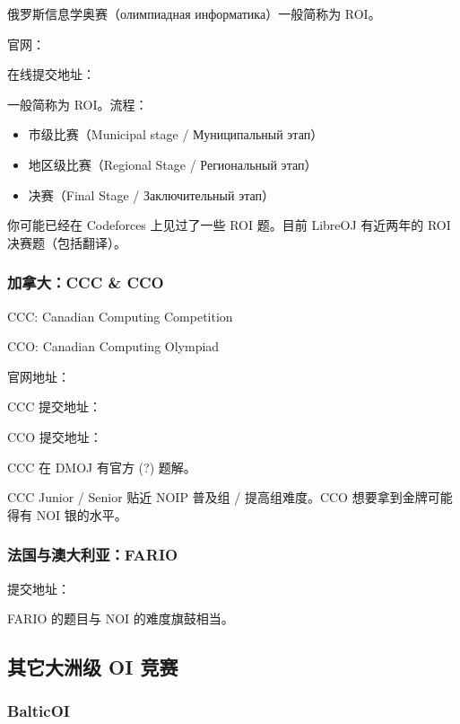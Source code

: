 俄罗斯信息学奥赛（олимпиадная информатика）一般简称为 ROI。  

官网：\href{http://neerc.ifmo.ru/school/archive/index.html}{}  

在线提交地址：\href{https://contest.yandex.ru/roiarchive/}{}  

一般简称为 ROI。流程：

\begin{itemize}
\item 市级比赛（Municipal stage / Муниципальный этап）
\item 地区级比赛（Regional Stage / Региональный этап）
\item 决赛（Final Stage / Заключительный этап）
\end{itemize}

你可能已经在 Codeforces 上见过了一些 ROI 题。目前 LibreOJ 有近两年的 ROI 决赛题（包括翻译）。

\subsubsection{加拿大：CCC \& CCO}

CCC: Canadian Computing Competition  

CCO: Canadian Computing Olympiad  

官网地址：\href{https://cemc.math.uwaterloo.ca/contests/past_contests.html#ccc}{}  

CCC 提交地址：\href{https://dmoj.ca/problems/?category=4}{}  

CCO 提交地址：\href{https://dmoj.ca/problems/?category=24}{}  

CCC 在 DMOJ 有官方 (?) 题解。  

CCC Junior / Senior 贴近 NOIP 普及组 / 提高组难度。CCO 想要拿到金牌可能得有 NOI 银的水平。

\subsubsection{法国与澳大利亚：FARIO}

提交地址：\href{http://orac.amt.edu.au/cgi-bin/train/hub.pl}{}

FARIO 的题目与 NOI 的难度旗鼓相当。

\subsection{其它大洲级 OI 竞赛}

\subsubsection{BalticOI}

